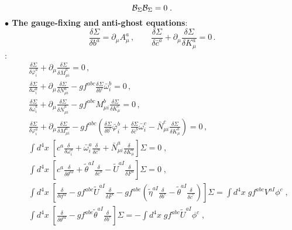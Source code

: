 \begin{appendix}
\begin{equation}
{\cal B}_{\Sigma} {\cal B}_{\Sigma} = 0 \;.    \label{nlst}
\end{equation}
%
%
{\bf $\bullet$  The gauge-fixing and anti-ghost equations}:
\begin{equation}
\frac{\delta\Sigma}{\delta b^{a}}=\partial_{\mu}A^{a}_{\mu}\,,\qquad
\frac{\delta\Sigma}{\delta\bar{c}^{a}}+\partial_{\mu}\frac{\delta\Sigma}{\delta K^{a}_{\mu}}=0\,.
\label{GFandAntiGhost2}
\end{equation}
%
%
:
\begin{eqnarray}
&&\frac{\delta \Sigma}{\delta \bar{\varphi}^{a}_{i}} + \partial_{\mu}\frac{\delta\Sigma}{\delta \bar{M}^{a}_{\mu i}}  = 0\,,
\\
&&\frac{\delta\Sigma}{\delta\omega^{a}_{i}} + \partial_{\mu}\frac{\delta\Sigma}{\delta N^{a}_{\mu i}} - gf^{abc} \frac{\delta \Sigma}{\delta b^{c}} \bar{\omega}^{b}_{i} = 0\,,
\\
&&
\frac{\delta \Sigma}{\delta \bar{\omega}^{a}_{i}} 
+ \partial_{\mu}\frac{\delta\Sigma}{\delta\bar{N}^{a}_{\mu i}} 
- gf^{abc} M^{b}_{\mu i}\frac{\delta\Sigma}{\delta K^{c}_{\mu}} = 0\,,
\\
&&
\frac{\delta\Sigma}{\delta\varphi^{a}_{i}} 
+ \partial_{\mu}\frac{\delta\Sigma}{\delta M^{a}_{\mu i}} 
- gf^{abc}\left( \frac{\delta \Sigma}{\delta b^{c}}\bar{\varphi}^{b}_{i} 
+ \frac{\delta \Sigma}{\delta \bar{c}^{b}} \bar{\omega}^{c}_{i} 
- \bar{N}^{c}_{\mu i} \frac{\delta \Sigma}{\delta K^{b}_{\mu}} \right) = 0 \,,
\\
&&
\int d^{4}x\; \left[ c^{a}\frac{\delta }{\delta \omega^{a}_{i}} + \bar{\omega}^{a}_{i}\frac{\delta }{\delta\bar{c}^{a}} + \bar{N}^{a}_{\mu i}\frac{\delta }{\delta K^{a}_{\mu}} \right]\Sigma  = 0  \;,
\\
&&
\int d^{4}x\; \left[ c^{a}\frac{\delta }{\delta \theta^{aI}} + \tilde{\theta}^{aI}\frac{\delta }{\delta\bar{c}^{a}} - \tilde{U}^{aI}\frac{\delta }{\delta F^{a}} \right]\Sigma  = 0  \;,
\\
&&
\int d^{4}x\; \left[ \frac{\delta }{\delta \eta^{bI}} - gf^{abc}\tilde{U}^{aI}\frac{\delta}{\delta F^{c}} - gf^{abe}\left(\tilde{\eta}^{aI}\frac{\delta}{\delta b^{e}}-\tilde{\theta}^{aI}\frac{\delta}{\delta \bar{c}^{e}}\right) \right]\Sigma  = \int d^{4}x\; gf^{abc}V^{aI}\phi^{c}  \;,
\\
&&
\int d^{4}x\; \left[ \frac{\delta }{\delta \theta^{bI}} - gf^{abe}\tilde{\theta}^{aI}\frac{\delta}{\delta b^{e}} \right]\Sigma  = -\int d^{4}x\; gf^{abc}\tilde{U}^{aI}\phi^{c}  \;,
\\

\end{eqnarray}
\end{appendix}
